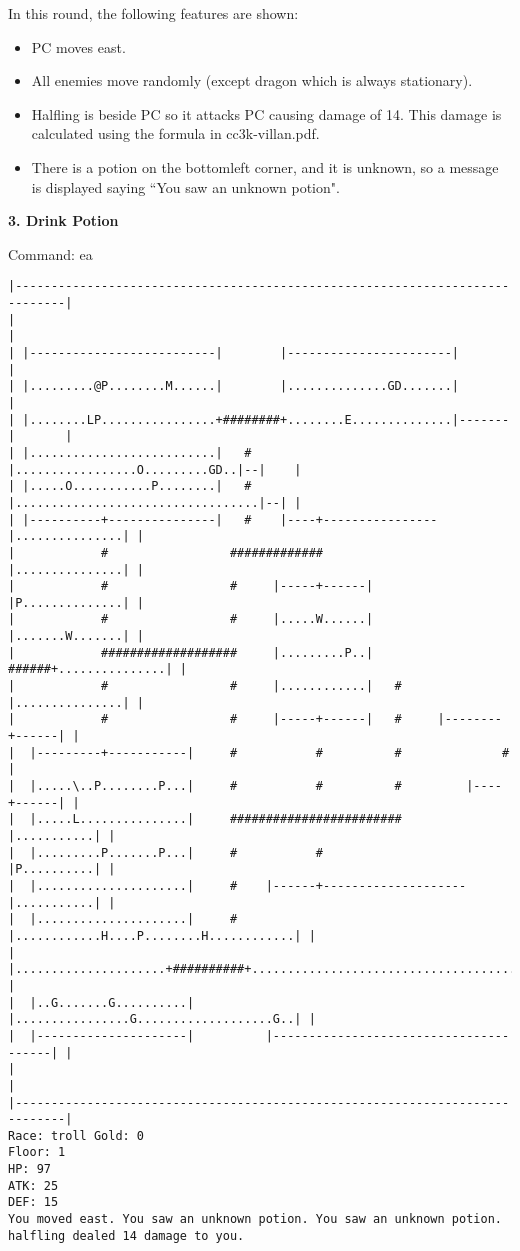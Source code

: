 \documentclass[11pt]{article}
\theoremstyle{plain}
\begin{document}
In this round, the following features are shown:
\begin{itemize}
	\item PC moves east.
	\item All enemies move randomly (except dragon which is always stationary).
	\item Halfling is beside PC so it attacks PC causing damage of 14.
		This damage is calculated using the formula in cc3k-villan.pdf.
	\item There is a potion on the bottomleft corner, and it is unknown, so a 
		message is displayed saying ``You saw an unknown potion". 
\end{itemize}


\newpage
\textbf{3. Drink Potion}

Command: ea
\begin{Verbatim}[fontsize=\scriptsize]
|-----------------------------------------------------------------------------|
|                                                                             |
| |--------------------------|        |-----------------------|               |
| |.........@P........M......|        |..............GD.......|               |
| |........LP................+########+........E..............|-------|       |
| |..........................|   #    |.................O.........GD..|--|    |
| |.....O...........P........|   #    |..................................|--| |
| |----------+---------------|   #    |----+----------------|...............| |
|            #                 #############                |...............| |
|            #                 #     |-----+------|         |P..............| |
|            #                 #     |.....W......|         |.......W.......| |
|            ###################     |.........P..|   ######+...............| |
|            #                 #     |............|   #     |...............| |
|            #                 #     |-----+------|   #     |--------+------| |
|  |---------+-----------|     #           #          #              #        |
|  |.....\..P........P...|     #           #          #         |----+------| |
|  |.....L...............|     ########################         |...........| |
|  |.........P.......P...|     #           #                    |P..........| |
|  |.....................|     #    |------+--------------------|...........| |
|  |.....................|     #    |............H....P........H............| |
|  |.....................+##########+.......................................| |
|  |..G.......G..........|          |................G...................G..| |
|  |---------------------|          |---------------------------------------| |
|                                                                             |
|-----------------------------------------------------------------------------|
Race: troll Gold: 0                                                    Floor: 1
HP: 97
ATK: 25
DEF: 15
You moved east. You saw an unknown potion. You saw an unknown potion. halfling dealed 14 damage to you. 
\end{Verbatim}
\end{document}
